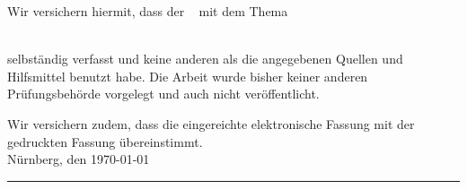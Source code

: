Wir versichern hiermit, dass der \arbeit~ mit dem Thema

\emph{\titel}\\
selbständig verfasst und keine anderen als die angegebenen Quellen und Hilfsmittel benutzt habe. Die Arbeit wurde bisher keiner anderen Prüfungsbehörde vorgelegt und auch nicht veröffentlicht.


Wir versichern zudem, dass die eingereichte elektronische Fassung mit der gedruckten Fassung übereinstimmt.\\[10ex]

Nürnberg, den \today \\[4ex]


\rule[-0.2cm]{10cm}{0.5pt} \\

\textsc{\autor} \\[10ex]
